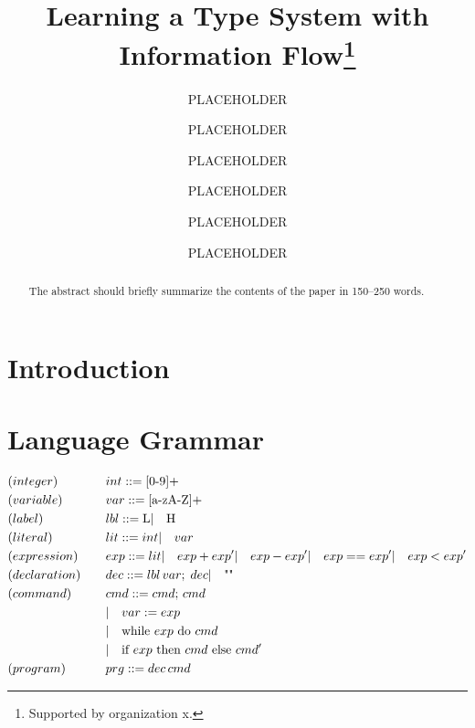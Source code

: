 \documentclass[runningheads]{llncs}
\newcommand{\mI}{\hspace{0.5em | \hspace{0.5em}} }
\begin{document}
%
\title{Learning a Type System with Information Flow\thanks{Supported by organization x.}}
%
%
\author{PLACEHOLDER \and PLACEHOLDER \and PLACEHOLDER \and PLACEHOLDER \and PLACEHOLDER \and PLACEHOLDER}
%
%
%
\maketitle              %
%
\begin{abstract}
The abstract should briefly summarize the contents of the paper in
150--250 words.

\end{abstract}
%
%
%
\section{Introduction}

\section{Language Grammar}
\begin{alignat*}{3}
&(integer)      \quad &&int ::= \text{[0-9]+}\\
&(variable)     \quad &&var ::= \text{[a-zA-Z]+}\\
&(label)        \quad &&lbl ::= \text{L} \mI \text{H}\\
&(literal)      \quad &&lit ::= int \mI var\\
&(expression)   \quad &&exp ::= lit \mI exp + exp' \mI exp - exp' \mI exp == exp' \mI exp < exp'\\
&(declaration)  \quad &&dec ::= lbl \, var; \; dec \mI \text{""}\\
&(command)      \quad &&cmd ::= cmd; \, cmd\\
&&& \mI  var := exp\\
&&& \mI  \text{while $exp$ do $cmd$}\\
&&& \mI  \text{if $exp$ then $cmd$ else $cmd'$}\\
&(program)      \quad &&prg ::= dec \, cmd
\end{alignat*}
\end{document}
